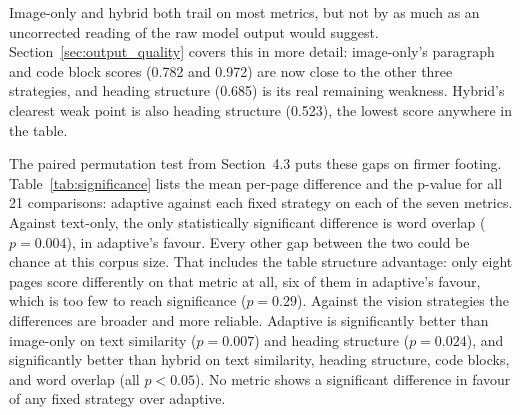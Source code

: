 Image-only and hybrid both trail on most metrics, but not by as much as an
uncorrected reading of the raw model output would suggest.
Section~\ref{sec:output_quality} covers this in more detail: image-only's
paragraph and code block scores (0.782 and 0.972) are now close to the other
three strategies, and heading structure (0.685) is its real remaining
weakness. Hybrid's clearest weak point is also heading structure (0.523),
the lowest score anywhere in the table.

The paired permutation test from Section~4.3 puts these gaps on firmer
footing. Table~\ref{tab:significance} lists the mean per-page difference and
the p-value for all 21 comparisons: adaptive against each fixed strategy on
each of the seven metrics. Against text-only, the only statistically significant difference is
word overlap ($p = 0.004$), in adaptive's favour. Every other gap between the
two could be chance at this corpus size. That includes the table structure
advantage: only eight pages score differently on that metric at all, six of
them in adaptive's favour, which is too few to reach significance
($p = 0.29$). Against the vision strategies the differences are broader and
more reliable. Adaptive is significantly better than image-only on text
similarity ($p = 0.007$) and heading structure ($p = 0.024$), and
significantly better than hybrid on text similarity, heading structure, code
blocks, and word overlap (all $p < 0.05$). No metric shows a significant
difference in favour of any fixed strategy over adaptive.

